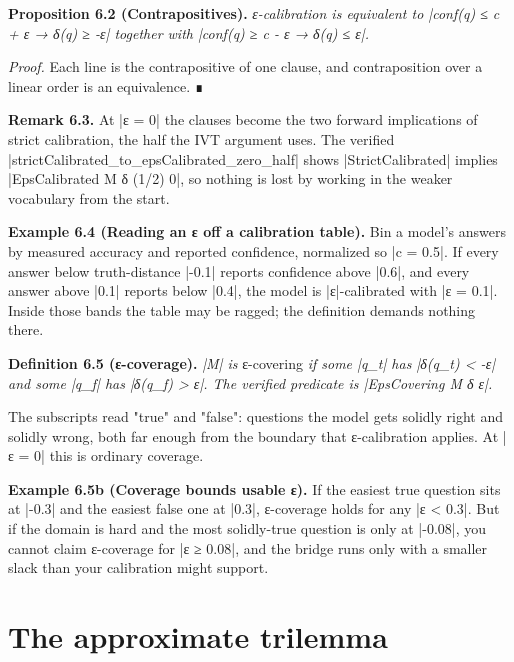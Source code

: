\documentclass{memoir}
\begin{document}
\textbf{Proposition 6.2 (Contrapositives).} \emph{ε-calibration is equivalent to
\LeanVerb|conf(q) ≤ c + ε → δ(q) ≥ -ε| together with \LeanVerb|conf(q) ≥ c - ε → δ(q) ≤ ε|.}

\emph{Proof.} Each line is the contrapositive of one clause, and contraposition over a
linear order is an equivalence. ∎

\textbf{Remark 6.3.} At \LeanVerb|ε = 0| the clauses become the two forward implications of strict
calibration, the half the IVT argument uses. The verified
\LeanVerb|strictCalibrated_to_epsCalibrated_zero_half| shows \LeanVerb|StrictCalibrated| implies
\LeanVerb|EpsCalibrated M δ (1/2) 0|, so nothing is lost by working in the weaker
vocabulary from the start.

\textbf{Example 6.4 (Reading an ε off a calibration table).} Bin a model's answers by
measured accuracy and reported confidence, normalized so \LeanVerb|c = 0.5|. If every
answer below truth-distance \LeanVerb|-0.1| reports confidence above \LeanVerb|0.6|, and every
answer above \LeanVerb|0.1| reports below \LeanVerb|0.4|, the model is \LeanVerb|ε|-calibrated with \LeanVerb|ε = 0.1|.
Inside those bands the table may be ragged; the definition demands nothing
there.

\textbf{Definition 6.5 (ε-coverage).} \emph{\LeanVerb|M| is} ε-covering \emph{if some \LeanVerb|q_t| has \LeanVerb|δ(q_t) < -ε|
and some \LeanVerb|q_f| has \LeanVerb|δ(q_f) > ε|. The verified predicate is \LeanVerb|EpsCovering M δ ε|.}

The subscripts read "true" and "false": questions the model gets solidly right
and solidly wrong, both far enough from the boundary that ε-calibration applies.
At \LeanVerb|ε = 0| this is ordinary coverage.

\textbf{Example 6.5b (Coverage bounds usable ε).} If the easiest true question sits at
\LeanVerb|-0.3| and the easiest false one at \LeanVerb|0.3|, ε-coverage holds for any \LeanVerb|ε < 0.3|.
But if the domain is hard and the most solidly-true question is only at \LeanVerb|-0.08|,
you cannot claim ε-coverage for \LeanVerb|ε ≥ 0.08|, and the bridge runs only with a
smaller slack than your calibration might support.



\section{The approximate trilemma}\label{Two--Schemas--of--Impossibility-005F-005F-005F--Machine--Checked--Limits--of--Trustworthy--Machine--Learning-005F-005F-005F--and--Why--They--Tighten--with--Capability----Approximate--Bridges--to--Real--Models----The--approximate--trilemma}
\end{document}
